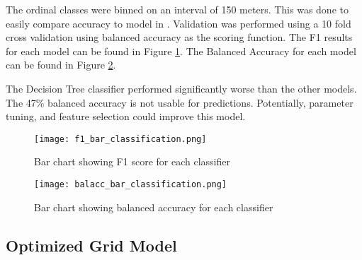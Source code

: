 \par
The ordinal classes were binned on an interval of 150 meters.
This was done to easily compare accuracy to model in \cite{jena2012prediction}.
Validation was performed using a 10 fold cross validation using balanced accuracy as the scoring function.
The F1 results for each model can be found in Figure \ref{fig:f1_barplot_classification}.
The Balanced Accuracy for each model can be found in Figure \ref{fig:balacc_barplot_classification}.

\par
The Decision Tree classifier performed significantly worse than the other models.
The 47\% balanced accuracy is not usable for predictions.
Potentially, parameter tuning, and feature selection could improve this model.


\begin{figure}[htp]
    \centering
    \texttt{[image: f1\_bar\_classification.png]}
    \caption{Bar chart showing F1 score for each classifier}
    \label{fig:f1_barplot_classification}
\end{figure}

\begin{figure}[htp]
    \centering
    \texttt{[image: balacc\_bar\_classification.png]}
    \caption{Bar chart showing balanced accuracy for each classifier}
    \label{fig:balacc_barplot_classification}
\end{figure}

\subsection{Optimized Grid Model}
\setlength{\parindent}{10ex}

